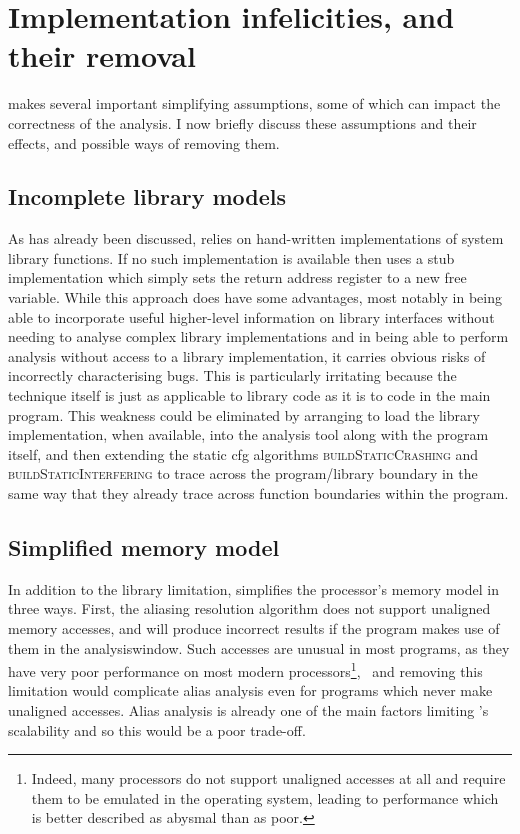 \section{Implementation infelicities, and their removal}
{\Implementation} makes several important simplifying assumptions,
some of which can impact the correctness of the analysis.  I now
briefly discuss these assumptions and their effects, and possible ways
of removing them.

\subsection{Incomplete library models}
As has already been discussed, {\implementation} relies on
hand-written {\StateMachine} implementations of system library
functions.  If no such implementation is available then
{\implementation} uses a stub implementation which simply sets the
return address register to a new free variable.  While this approach
does have some advantages, most notably in being able to incorporate
useful higher-level information on library interfaces without needing
to analyse complex library implementations and in being able to
perform analysis without access to a library implementation, it
carries obvious risks of incorrectly characterising bugs.  This is
particularly irritating because the {\technique} technique itself is
just as applicable to library code as it is to code in the main
program.  This weakness could be eliminated by arranging to load the
library implementation, when available, into the {\implementation}
analysis tool along with the program itself, and then extending the
\gls{static cfg} algorithms \textsc{buildStaticCrashing} and
\textsc{buildStaticInterfering} to trace across the program/library
boundary in the same way that they already trace across function
boundaries within the program.

\subsection{Simplified memory model}
\label{sect:derive:simpl_mem_model}

In addition to the library limitation, {\implementation} simplifies
the processor's memory model in three ways.  First, the aliasing
resolution algorithm does not support unaligned memory accesses, and
will produce incorrect results if the program makes use of them in the
\gls{analysiswindow}.  Such accesses are unusual in most programs, as
they have very poor performance on most modern
processors\footnote{Indeed, many processors do not support unaligned
  accesses at all and require them to be emulated in the operating
  system, leading to performance which is better described as abysmal
  than as poor.}\!\!\!\!\!,~ and removing this limitation would complicate alias
analysis even for programs which never make unaligned accesses.  Alias
analysis is already one of the main factors limiting
{\implementation}'s scalability and so this would be a poor trade-off.

